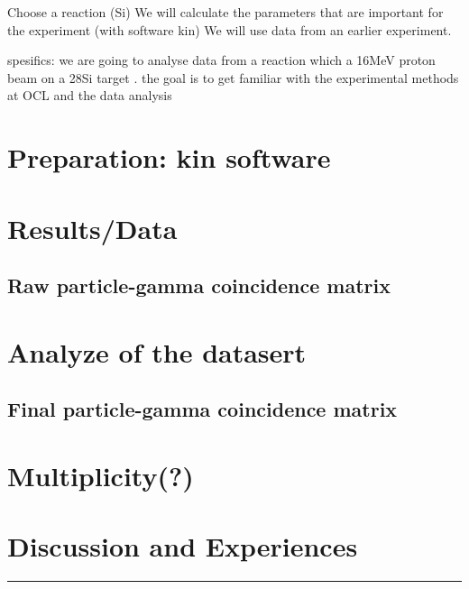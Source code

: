 \documentclass[11pt,a4wide]{article}
\begin{document}
Choose a reaction (Si)
We will calculate the parameters that are important for the experiment (with software kin)
We will use data from an earlier experiment.



spesifics:
we are going to analyse data from a reaction which a 16MeV proton beam on a 28Si target . the goal is to get familiar with the experimental methods at OCL and the data analysis



\section{Preparation: kin software}

\section{Results/Data}
\subsection{Raw particle-gamma coincidence matrix}

\section{Analyze of the datasert}
\subsection{Final particle-gamma coincidence matrix}

\section{Multiplicity(?)}

\section{Discussion and Experiences}


\noindent\rule{\textwidth}{1pt}
\end{document}
